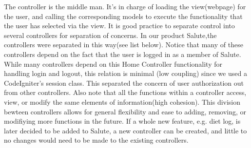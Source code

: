 \documentclass[12pt]{report}
\begin{document}
The controller is the middle man. It's in charge of loading the view(webpage) for the user, and calling the corresponding models to execute the functionality that the user has selected via the view. 
It is good practice to separate control into several controllers for separation of concerns. In our product Salute,the controllers were separated in this way(see list below). Notice that many of these controllers depend on the fact that the user is logged in as a member of Salute. While many controllers depend on this Home Controller functionality for handling login and logout, this relation is minimal (low coupling) since we used a CodeIgniter's session class. This separated the concern of user authorization out from other controllers. 
Also note that all the functions within a controller access, view, or modify the same elements of information(high cohesion). This division bewteen controllers allows for general flexibility and ease to adding, removing, or modifiying more functions in the future. If a whole new feature, e.g. diet log, is later decided to be added to Salute, a new controller can be created, and little to no changes would need to be made to the existing controllers. 
\end{document}

